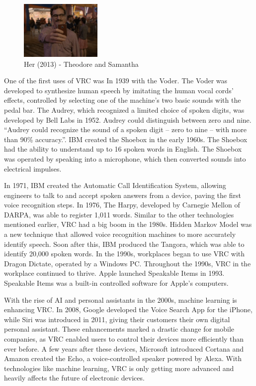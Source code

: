\documentclass{article}
\begin{document}
\begin{figure}[!ht]
    \caption{Her (2013) - Theodore and Samantha}
    \label{image:HER}
    \centering
    \includegraphics[width=0.35\textwidth]{pics/Her.png}
\end{figure}

One of the first uses of VRC was In 1939 with the Voder. The Voder was developed to synthesize human speech by imitating the human vocal cords’ effects, controlled by selecting one of the machine’s two basic sounds with the pedal bar. The Audrey, which recognized a limited choice of spoken digits, was developed by Bell Labs in 1952. Audrey could distinguish between zero and nine. “Audrey could recognize the sound of a spoken digit – zero to nine – with more than 90\% accuracy.”. IBM created the Shoebox in the early 1960s. The Shoebox had the ability to understand up to 16 spoken words in English. The Shoebox was operated by speaking into a microphone, which then converted sounds into electrical impulses.

In 1971, IBM created the Automatic Call Identification System, allowing engineers to talk to and accept spoken answers from a device, paving the first voice recognition steps. In 1976, The Harpy, developed by Carnegie Mellon of DARPA, was able to register 1,011 words. Similar to the other technologies mentioned earlier, VRC had a big boom in the 1980s. Hidden Markov Model was a new technique that allowed voice recognition machines to more accurately identify speech. Soon after this, IBM produced the Tangora, which was able to identify 20,000 spoken words. In the 1990s, workplaces began to use VRC with Dragon Dictate, operated by a Windows PC. Throughout the 1990s, VRC in the workplace continued to thrive. Apple launched Speakable Items in 1993. Speakable Items was a built-in controlled software for Apple's computers. 

With the rise of AI and personal assistants in the 2000s, machine learning is enhancing VRC. In 2008, Google developed the Voice Search App for the iPhone, while Siri was introduced in 2011, giving their customers their own digital personal assistant. These enhancements marked a drastic change for mobile companies, as VRC enabled users to control their devices more efficiently than ever before. A few years after these devices, Microsoft introduced Cortana and Amazon created the Echo, a voice-controlled speaker powered by Alexa. With technologies like machine learning, VRC is only getting more advanced and heavily affects the future of electronic devices.
\cite{ref10}
\end{document}
